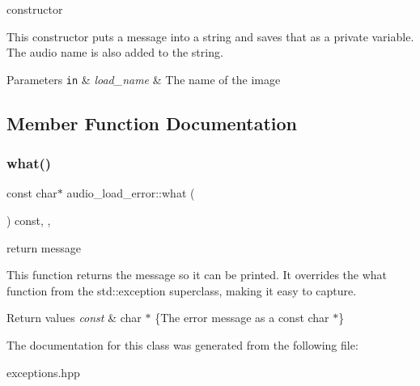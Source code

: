 constructor 

This constructor puts a message into a string and saves that as a private variable. The audio name is also added to the string.


\begin{DoxyParams}[1]{Parameters}
\mbox{\tt in}  & {\em load\+\_\+name} & The name of the image \\
\hline
\end{DoxyParams}


\subsection{Member Function Documentation}
\mbox{\label{classaudio__load__error_a364ad9c1cb7de37f0cb3e33dbebbaa47}} 
\subsubsection{\texorpdfstring{what()}{what()}}
{\footnotesize\ttfamily const char$\ast$ audio\+\_\+load\+\_\+error\+::what (\begin{DoxyParamCaption}{ }\end{DoxyParamCaption}) const\hspace{0.3cm}{\ttfamily [inline]}, {\ttfamily [override]}, {\ttfamily [noexcept]}}



return message 

This function returns the message so it can be printed. It overrides the what function from the std\+::exception superclass, making it easy to capture.


\begin{DoxyRetVals}{Return values}
{\em const} & char $\ast$ \{The error message as a const char $\ast$\} \\
\hline
\end{DoxyRetVals}


The documentation for this class was generated from the following file\+:\begin{DoxyCompactItemize}
\item 
exceptions.\+hpp\end{DoxyCompactItemize}
